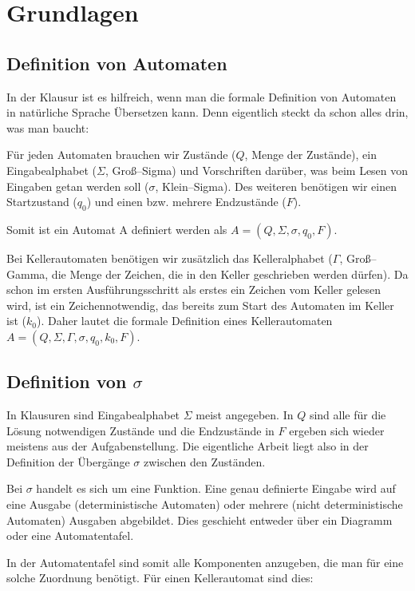\section{Grundlagen}
\label{sec:grundlagen}

\subsection{Definition von Automaten}

In der Klausur ist es hilfreich, wenn man die formale Definition von Automaten in natürliche Sprache Übersetzen kann. Denn eigentlich steckt da schon alles drin, was man baucht:

Für jeden Automaten brauchen wir Zustände ($Q$, Menge der Zustände), ein Eingabealphabet ($\Sigma$, Groß--Sigma) und Vorschriften darüber, was beim Lesen von Eingaben getan werden soll ($\sigma$, Klein--Sigma). Des weiteren benötigen wir einen Startzustand ($q_0$) und einen bzw. mehrere Endzustände ($F$). 

Somit ist ein Automat A definiert werden als $A=(Q,\Sigma, \sigma, q_0, F)$.

Bei Kellerautomaten benötigen wir zusätzlich das Kelleralphabet ($\Gamma$, Groß--Gamma, die Menge der Zeichen, die in den Keller geschrieben werden dürfen). Da schon im ersten Ausführungsschritt als erstes ein Zeichen vom Keller gelesen wird, ist ein Zeichennotwendig, das bereits zum Start des Automaten im Keller ist ($k_0$). Daher lautet die formale Definition eines Kellerautomaten $A=(Q,\Sigma, \Gamma, \sigma, q_0, k_0, F)$.

\subsection{Definition von $\sigma$}

In Klausuren sind Eingabealphabet $\Sigma$ meist angegeben. In $Q$ sind alle für die Lösung notwendigen Zustände und die Endzustände in $F$ ergeben sich wieder meistens aus der Aufgabenstellung. Die eigentliche Arbeit liegt also in der Definition der Übergänge $\sigma$ zwischen den Zuständen.

Bei $\sigma$ handelt es sich um eine Funktion. Eine genau definierte Eingabe wird auf eine Ausgabe (deterministische Automaten) oder mehrere (nicht deterministische Automaten) Ausgaben abgebildet. Dies geschieht entweder über ein Diagramm oder eine Automatentafel.

In der Automatentafel sind somit alle Komponenten anzugeben, die man für eine solche Zuordnung benötigt.
Für einen Kellerautomat sind dies:

